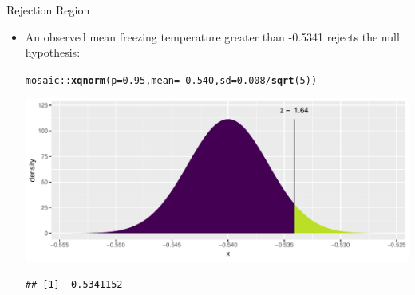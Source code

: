 \documentclass{beamer}\usepackage[]{graphicx}\usepackage[]{color}
\newcommand{\hlnum}[1]{\textcolor[rgb]{0.686,0.059,0.569}{#1}}%
\newcommand{\hlopt}[1]{\textcolor[rgb]{0,0,0}{#1}}%
\newcommand{\hlstd}[1]{\textcolor[rgb]{0.345,0.345,0.345}{#1}}%
\newcommand{\hlkwc}[1]{\textcolor[rgb]{0.333,0.667,0.333}{#1}}%
\newcommand{\hlkwd}[1]{\textcolor[rgb]{0.737,0.353,0.396}{\textbf{#1}}}%
\newenvironment{knitrout}{}{} %
\begin{document}
\begin{frame}[fragile]{Rejection Region}
\begin{itemize}

	\item An observed mean freezing temperature greater than -0.5341 rejects the null hypothesis:
	
\begin{knitrout}\scriptsize
{}\color{fgcolor}
\begin{alltt}
\hlstd{mosaic}\hlopt{::}\hlkwd{xqnorm}\hlstd{(}\hlkwc{p} \hlstd{=} \hlnum{0.95}\hlstd{,} \hlkwc{mean} \hlstd{=} \hlopt{-}\hlnum{0.540}\hlstd{,} \hlkwc{sd} \hlstd{=} \hlnum{0.008}\hlopt{/}\hlkwd{sqrt}\hlstd{(}\hlnum{5}\hlstd{))}
\end{alltt}


{\ttfamily\noindent\itshape\color{messagecolor}{\#\# }}

{\ttfamily\noindent\itshape{}}

{\ttfamily\noindent\itshape\color{messagecolor}{\#\# 	P(X <= -0.5341152) = 0.95}}

{\ttfamily\noindent\itshape\color{messagecolor}{\#\# 	P(X >\ \ -0.5341152) = 0.05}}

{\ttfamily\noindent\itshape\color{messagecolor}{\#\# }}

{\centering \includegraphics[width=1\linewidth]{figure/unnamed-chunk-3-1} 

}


\begin{verbatim}
## [1] -0.5341152
\end{verbatim}

\end{knitrout}

	
\end{itemize}
\end{frame}
\end{document}
